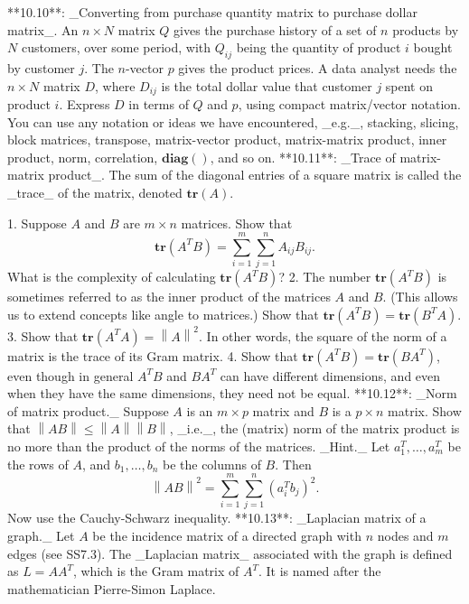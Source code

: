 

**10.10**: _Converting from purchase quantity matrix to purchase dollar matrix_. An \(n\times N\) matrix \(Q\) gives the purchase history of a set of \(n\) products by \(N\) customers, over some period, with \(Q_{ij}\) being the quantity of product \(i\) bought by customer \(j\). The \(n\)-vector \(p\) gives the product prices. A data analyst needs the \(n\times N\) matrix \(D\), where \(D_{ij}\) is the total dollar value that customer \(j\) spent on product \(i\). Express \(D\) in terms of \(Q\) and \(p\), using compact matrix/vector notation. You can use any notation or ideas we have encountered, _e.g._, stacking, slicing, block matrices, transpose, matrix-vector product, matrix-matrix product, inner product, norm, correlation, \(\mathbf{diag}()\), and so on.
**10.11**: _Trace of matrix-matrix product_. The sum of the diagonal entries of a square matrix is called the _trace_ of the matrix, denoted \(\mathbf{tr}(A)\).

1. Suppose \(A\) and \(B\) are \(m\times n\) matrices. Show that \[\mathbf{tr}(A^{T}B)=\sum_{i=1}^{m}\sum_{j=1}^{n}A_{ij}B_{ij}.\] What is the complexity of calculating \(\mathbf{tr}(A^{T}B)\)?
2. The number \(\mathbf{tr}(A^{T}B)\) is sometimes referred to as the inner product of the matrices \(A\) and \(B\). (This allows us to extend concepts like angle to matrices.) Show that \(\mathbf{tr}(A^{T}B)=\mathbf{tr}(B^{T}A)\).
3. Show that \(\mathbf{tr}(A^{T}A)=\left\|A\right\|^{2}\). In other words, the square of the norm of a matrix is the trace of its Gram matrix.
4. Show that \(\mathbf{tr}(A^{T}B)=\mathbf{tr}(BA^{T})\), even though in general \(A^{T}B\) and \(BA^{T}\) can have different dimensions, and even when they have the same dimensions, they need not be equal.
**10.12**: _Norm of matrix product._ Suppose \(A\) is an \(m\times p\) matrix and \(B\) is a \(p\times n\) matrix. Show that \(\left\|AB\right\|\leq\left\|A\right\|\left\|B\right\|\), _i.e._, the (matrix) norm of the matrix product is no more than the product of the norms of the matrices. _Hint._ Let \(a_{1}^{T},\ldots,a_{m}^{T}\) be the rows of \(A\), and \(b_{1},\ldots,b_{n}\) be the columns of \(B\). Then \[\left\|AB\right\|^{2}=\sum_{i=1}^{m}\sum_{j=1}^{n}(a_{i}^{T}b_{j})^{2}.\] Now use the Cauchy-Schwarz inequality.
**10.13**: _Laplacian matrix of a graph._ Let \(A\) be the incidence matrix of a directed graph with \(n\) nodes and \(m\) edges (see SS7.3). The _Laplacian matrix_ associated with the graph is defined as \(L=AA^{T}\), which is the Gram matrix of \(A^{T}\). It is named after the mathematician Pierre-Simon Laplace.

